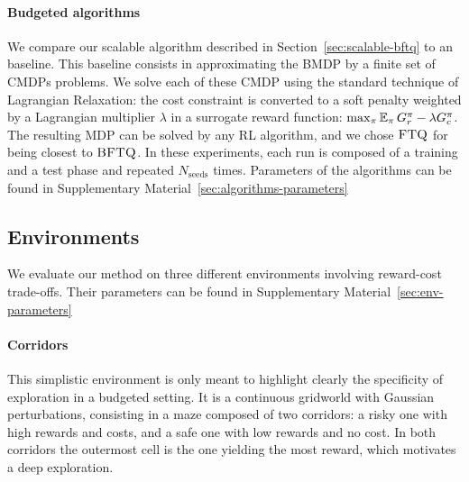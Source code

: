 \documentclass{article}
\begin{document}
\paragraph{Budgeted algorithms} We compare our  scalable \BFTQ algorithm described in Section~\ref{sec:scalable-bftq} to an \FTQl baseline. This baseline consists in approximating the BMDP by a finite set of CMDPs problems. We solve each of these CMDP using the standard technique of Lagrangian Relaxation: the cost constraint is converted to a soft penalty weighted by a Lagrangian multiplier $\lambda$ in a surrogate reward function: $\max_{\pi} \operatorname*{\mathbb{E}}_{\pi} G_r^\pi - \lambda G_c^\pi\label{eq:lagrangian}$. The resulting MDP can be solved by any RL algorithm, and we chose $\textrm{\textsc{FTQ}}$ for being closest to $\textrm{\textsc{BFTQ}}$.
In these experiments, each run is composed of a training and a test phase and repeated $N_{\text{seeds}}$ times. Parameters of the algorithms can be found in Supplementary Material~\ref{sec:algorithms-parameters}

\subsection{Environments}

We evaluate our method on three different environments involving reward-cost trade-offs. Their parameters can be found in Supplementary Material~\ref{sec:env-parameters}

\paragraph{Corridors}
This simplistic environment is only meant to highlight clearly the specificity of exploration in a budgeted setting. It is a continuous gridworld with Gaussian perturbations, consisting in a maze composed of two corridors: a risky one with high rewards and costs, and a safe one with low rewards and no cost. In both corridors the outermost cell is the one yielding the most reward, which motivates a deep exploration.
\end{document}
